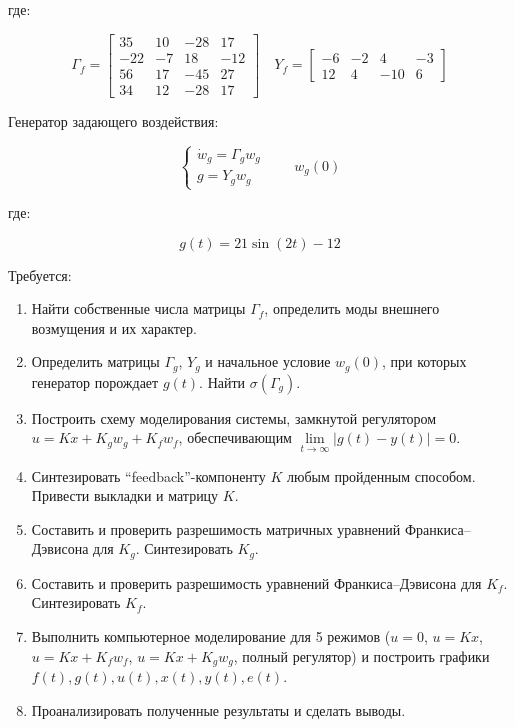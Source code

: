 \documentclass[a4paper,12pt]{article}
\begin{document}
	где:
	
	\[
	\Gamma_f = \begin{bmatrix}
		35 & 10 & -28 & 17 \\
		-22 & -7 & 18 & -12 \\
		56 & 17 & -45 & 27 \\
		34 & 12 & -28 & 17
	\end{bmatrix} \quad
	Y_f = \begin{bmatrix}
		-6 & -2 & 4 & -3 \\
		12 & 4 & -10 & 6
	\end{bmatrix}
	\]
	
	Генератор задающего воздействия:
	
	\begin{equation}
		\begin{cases}
			\dot{w}_g = \Gamma_g w_g \\
			g = Y_g w_g
		\end{cases}
		\qquad
		w_g(0)
		\label{gen}
	\end{equation}
	
	где:
	
	\begin{equation}
		g(t) = 21\sin(2t) - 12
		\label{g}
	\end{equation}
	
	Требуется:
	\begin{enumerate}
		\item Найти собственные числа матрицы $\Gamma_f$, определить моды внешнего возмущения и их характер.
		
		\item Определить матрицы $\Gamma_g$, $Y_g$ и начальное условие $w_g(0)$, при которых генератор порождает $g(t)$. Найти $\sigma(\Gamma_g)$.
		
		\item Построить схему моделирования системы, замкнутой регулятором $u = Kx + K_g w_g + K_f w_f$, обеспечивающим $\lim\limits_{t\to\infty} |g(t) - y(t)| = 0$.
		
		\item Синтезировать ``feedback''-компоненту $K$ любым пройденным способом. Привести выкладки и матрицу $K$.
		
		\item Составить и проверить разрешимость матричных уравнений Франкиса–Дэвисона для $K_g$. Синтезировать $K_g$.
		
		\item Составить и проверить разрешимость уравнений Франкиса–Дэвисона для $K_f$. Синтезировать $K_f$.
		
		\item Выполнить компьютерное моделирование для 5 режимов ($u=0$, $u=Kx$, $u=Kx+K_f w_f$, $u=Kx+K_g w_g$, полный регулятор) и построить графики $f(t), g(t), u(t), x(t), y(t), e(t)$.
		
		\item Проанализировать полученные результаты и сделать выводы.
	\end{enumerate}
	
\end{document}
